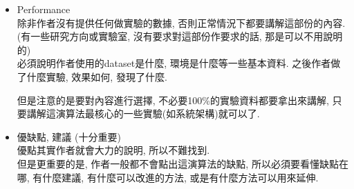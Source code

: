 \begin{enumerate}
{\begin{itemize}
{\begin{enumerate}
          \item
          {
            Lemma\\
            是Theorem分開用來簡單說明的一個東西
          } %

          \item
          {
            Theorem\\
            是Lemma集合出的一個理論
          } %

          \item
          {
            Corollary\\
            在Theorem的結果用另一種條件或什麼得出的另一結果
          } %

          \item
          {
            Proposition\\
            以上的看情況來決定要不要講, 如果是跟algorithm無關的, 則不用講, 否則要講一點點.\\

            如果不講定理, 都能講懂algorithm, 那則不用講.\\
            而如果algorithm會使用到一個小小的定理, 即只要講定理的結果.
          } %

          \item
          {
            Proof\\
            在報告時是絕對不用講的
          } %
        \end{enumerate}
      } %

      \item
      {
        Performance\\
        除非作者沒有提供任何做實驗的數據, 否則正常情況下都要講解這部份的內容.
        (有一些研究方向或實驗室, 沒有要求對這部份作要求的話, 那是可以不用說明的)\\
        必須說明作者使用的dataset是什麼, 環境是什麼等一些基本資料. 之後作者做了什麼實驗, 效果如何, 發現了什麼.

        但是注意的是要對內容進行選擇, 不必要100\%的實驗資料都要拿出來講解, 只要講解這演算法最核心的一些實驗(如系統架構)就可以了.
      } %

      \item
      {
        優缺點, 建議 (十分重要)\\
        優點其實作者就會大力的說明, 所以不難找到.\\         
        但是更重要的是, 作者一般都不會點出這演算法的缺點, 所以必須要看懂缺點在哪, 有什麼建議, 有什麼可以改進的方法, 或是有什麼方法可以用來延伸.
      } %


\end{itemize}}
\end{enumerate}

